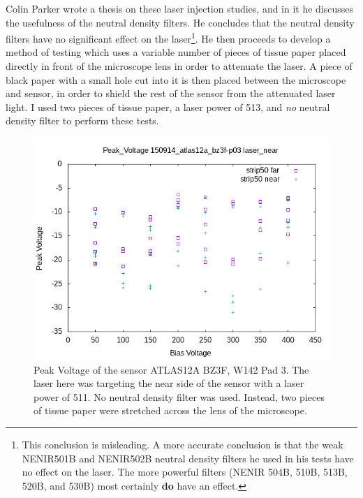 \documentclass{report}
\begin{document}
            Colin Parker wrote a thesis on these laser injection studies, and in it he discusses the usefulness of the neutral density filters. He concludes that the neutral density filters have no significant effect on the laser\footnote{This conclusion is misleading. A more accurate conclusion is that the weak NENIR501B and NENIR502B neutral density filters he used in his tests have no effect on the laser. The more powerful filters (NENIR 504B, 510B, 513B, 520B, and 530B) most certainly \textbf{do} have an effect.}. He then proceeds to develop a method of testing which uses a variable number of pieces of tissue paper placed directly in front of the microscope lens in order to attenuate the laser. A piece of black paper with a small hole cut into it is then placed between the microscope and sensor, in order to shield the rest of the sensor from the attenuated laser light. I used two pieces of tissue paper, a laser power of 513, and \textit{no} neutral density filter to perform these tests.

            \begin{figure}[h] 
                \includegraphics[height=.4\textheight]{Peak_Voltage__150914_atlas12a_bz3f-p03__laser_near}
                \centering
                \caption{ Peak Voltage of the sensor ATLAS12A BZ3F, W142 Pad 3. The laser here was targeting the near side of the sensor with a laser power of 511. No neutral density filter was used. Instead, two pieces of tissue paper were stretched across the lens of the microscope. }
                \label{fig:Peak_Voltage__150914_atlas12a_bz3f-p03__laser_near}
            \end{figure}
\end{document}
